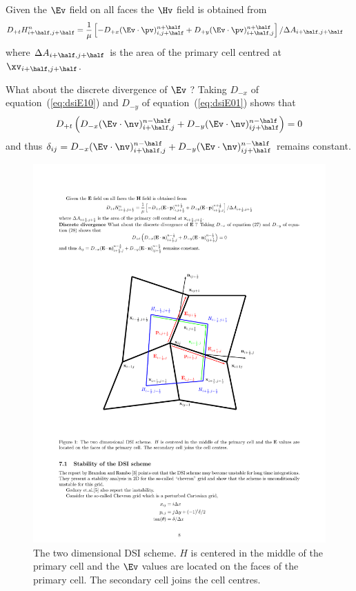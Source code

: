\documentclass[10pt]{article}
\begin{document}
Given the $\Ev$ field on all faces the $\Hv$ field is obtained from
\begin{align*}
  D_{+t} H_{i\ph,j\ph}^{n} &=  {1\over\mu}\left[ - D_{+x} (\Ep)_{i,j\ph}^{n\ph}
               + D_{+y} (\Ep)_{i\ph,j}^{n\ph} \right] /\Delta A_{i\ph,j\ph}
\end{align*}
where $\Delta A_{i\ph,j\ph}$ is the area of the primary cell centred at $\xv_{i\ph,j\ph}$.
  
 What about the discrete divergence of $\Ev$ ?
Taking $D_{-x}$ of equation~(\ref{eq:dsiE10}) and  $D_{-y}$ of equation~(\ref{eq:dsiE01}) shows that 
\[
   D_{+t}\left( D_{-x} (\En)_{i\ph,j}^{n\mh} + D_{-y} (\En)_{ij\ph}^{n\mh} \right) = 0
\]
and thus $\delta_{ij} = D_{-x} (\En)_{i\ph,j}^{n\mh} + D_{-y} (\En)_{ij\ph}^{n\mh} $ remains constant.


{
\newcommand{\figWidthdsi}{16cm}
\begin{figure}
\begin{center}
\includegraphics[width=\figWidthdsi]{figures/DSIGrid}
\end{center}
\caption{The two dimensional DSI scheme. $H$ is centered in the middle of the primary cell
and the $\Ev$ values are located on the faces of the primary cell. The secondary cell joins
the cell centres. } \label{fig:DSI-2D}
\end{figure}
}
\end{document}

